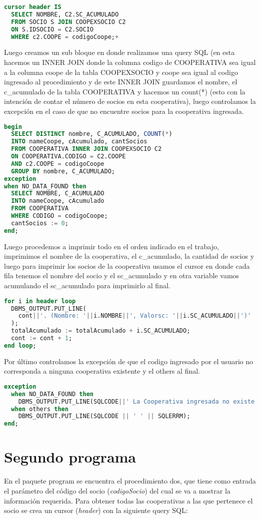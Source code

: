 \documentclass{article}
\begin{document}
\begin{lstlisting}[language=SQL]
cursor header IS
  SELECT NOMBRE, C2.SC_ACUMULADO
  FROM SOCIO S JOIN COOPEXSOCIO C2 
  ON S.IDSOCIO = C2.SOCIO
  WHERE c2.COOPE = codigoCoope;+\end{lstlisting}
  Luego creamos un sub bloque en donde realizamos una query SQL (en esta hacemos un INNER JOIN donde la columna codigo de COOPERATIVA sea igual a la columna coope de la tabla COOPEXSOCIO y coope sea igual al codigo ingresado al procedimiento y de este INNER JOIN guardamos el nombre, el c\_acumulado de la tabla COOPERATIVA y hacemos un count(*) (esto con la intención de contar el número de socios en esta cooperativa), luego controlamos la excepción en el caso de que no encuentre socios para la cooperativa ingresada.
\begin{lstlisting}[language=SQL]
begin
  SELECT DISTINCT nombre, C_ACUMULADO, COUNT(*)
  INTO nameCoope, cAcumulado, cantSocios
  FROM COOPERATIVA INNER JOIN COOPEXSOCIO C2 
  ON COOPERATIVA.CODIGO = C2.COOPE 
  AND c2.COOPE = codigoCoope
  GROUP BY nombre, C_ACUMULADO;
exception
when NO_DATA_FOUND then
  SELECT NOMBRE, C_ACUMULADO
  INTO nameCoope, cAcumulado
  FROM COOPERATIVA
  WHERE CODIGO = codigoCoope;
  cantSocios := 0;
end;\end{lstlisting}
Luego procedemos a imprimir todo en el orden indicado en el trabajo, imprimimos el nombre de la cooperativa, el c\_acumulado, la cantidad de socios y luego para imprimir los socios de la cooperativa usamos el cursor en donde cada fila tenemos el nombre del socio y el sc\_acumulado y en otra variable vamos acumulando el sc\_acumulado para imprimirlo al final.
\begin{lstlisting}[language=SQL]
for i in header loop
  DBMS_OUTPUT.PUT_LINE(
    cont||'. (Nombre: '||i.NOMBRE||', Valorsc: '||i.SC_ACUMULADO||')'
  );
  totalAcumulado := totalAcumulado + i.SC_ACUMULADO;
  cont := cont + 1;
end loop;
\end{lstlisting}
Por último controlamos la excepción de que el codigo ingresado por el usuario no corresponda a ninguna cooperativa existente y el others al final.
\begin{lstlisting}[language=SQL]
exception
  when NO_DATA_FOUND then
    DBMS_OUTPUT.PUT_LINE(SQLCODE||' La Cooperativa ingresada no existe');
  when others then
    DBMS_OUTPUT.PUT_LINE(SQLCODE || ' ' || SQLERRM);
end;
\end{lstlisting}
\section{Segundo programa}
En el paquete program se encuentra el procedimiento dos, que tiene como entrada el parámetro del código del socio (\emph{codigoSocio}) del cual se va a mostrar la información requerida.
Para obtener todas las cooperativas a las que pertenece el socio se crea un cursor (\emph{header}) con la siguiente query SQL: 
\end{document}
